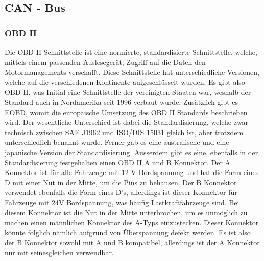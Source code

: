 \subsection{CAN - Bus}
\subsubsection{OBD II}
Die OBD-II Schnittstelle ist eine normierte, standardisierte Schnittstelle, welche, mittels einem passenden Auslesegerät, Zugriff auf die Daten den Motormanagements verschafft. Diese Schnittstelle hat unterschiedliche Versionen, welche auf die verschiedenen Kontinente aufgeschlüsselt wurden. Es gibt also OBD II, was Initial eine Schnittstelle der vereinigten Staaten war, weshalb der Standard auch in Nordamerika seit 1996 verbaut wurde. Zusätzlich gibt es EOBD, womit die europäische Umsetzung des OBD II Standards beschrieben wird.\cite{Directive.98/69/EC.EUParliament} Der wesentliche Unterschied ist dabei die Standardisierung, welche zwar technisch zwischen SAE J1962 und ISO/DIS 15031 gleich ist, aber trotzdem unterschiedlich benannt wurde. \cite{SAE.J1962} Ferner gab es eine australische \cite{AU.Motor.Vehicle.Standards.Act.1989} und eine japanische Version der Standardisierung.
\newline
\newline
Ausserdem gibt es eine, ebenfalls in der Standardisierung festgehalten einen OBD II A und B Konnektor. Der A Konnektor ist für alle Fahrzeuge mit 12 V Bordspannung und hat die Form eines D mit einer Nut in der Mitte, um die Pins zu behausen. Der B Konnektor verwendet ebenfalls die Form eines D's, allerdings ist dieser Konnektor für Fahrzeuge mit 24V Bordspannung, was häufig Lastkraftfahrzeuge sind. Bei diesem Konnektor ist die Nut in der Mitte unterbrochen, um es unmöglich zu machen einen männlichen Konnektor des A-Typs einzustecken. Dieser Konnektor könnte folglich nämlich aufgrund von Überspannung defekt werden. Es ist also der B Konnektor sowohl mit A und B kompatibel, allerdings ist der A Konnektor nur mit seinesgleichen verwendbar.


